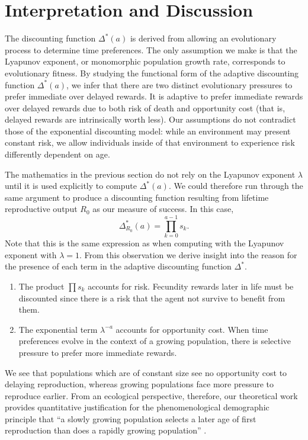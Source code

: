 \documentclass[titlepage, hidelinks, 12pt]{article}
\theoremstyle{plain}
\theoremstyle{remark}
\theoremstyle{definition}
\begin{document}
\section{Interpretation and Discussion}

The discounting function $\Delta^*(a)$ is derived from allowing an evolutionary process to determine time preferences. The only assumption
we make is that the Lyapunov exponent, or monomorphic population growth rate, corresponds to evolutionary fitness. By studying
the functional form of the adaptive discounting function $\Delta^*(a)$, we infer that there are two distinct evolutionary pressures to prefer
immediate over delayed rewards. It is adaptive to prefer immediate rewards over delayed rewards due to both
risk of death and opportunity cost (that is, delayed rewards are intrinsically worth less). Our assumptions do not contradict those
of the exponential discounting model: while an environment may present constant risk, we allow individuals inside of that environment to experience
risk differently dependent on age. 

The mathematics in the previous section do not rely on the Lyapunov exponent $\lambda$ until it is used
explicitly to compute $\Delta^*(a)$. We could therefore
run through the same argument to produce a discounting function resulting from lifetime reproductive output $R_0$ as our measure of success. In this
case, 
\begin{equation}
    \Delta_{R_0}^*(a) = \prod\limits_{k = 0}^{a-1} s_k.
\end{equation}
Note that this is the same expression as when computing with the Lyapunov exponent with $\lambda = 1$. From this observation we derive insight into
the reason for the presence of each term in the adaptive discounting function $\Delta^*$. 
\begin{enumerate}
    \item The product $\prod s_k$ accounts for risk. Fecundity rewards later in life must be discounted since there is a risk that the
        agent not survive to benefit from them.
    \item The exponential term $\lambda^{-a}$ accounts for opportunity cost. When time preferences evolve in the context of a growing
        population, there is selective pressure to prefer more immediate rewards. 
\end{enumerate}

We see that populations which are of constant size see no opportunity cost to delaying
reproduction, whereas growing populations face more pressure to reproduce earlier. 
From an ecological perspective, therefore, our theoretical work provides quantitative justification for the phenomenological demographic principle that
``a slowly growing population selects a later age of first reproduction than does a rapidly growing population''  
\cite{bull04}.  
\end{document}
